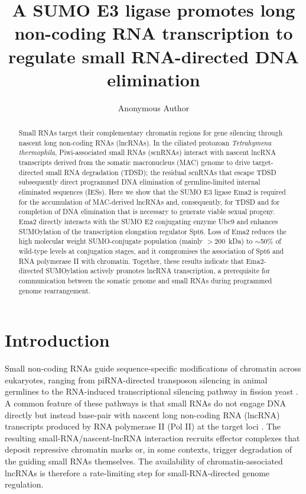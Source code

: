 \documentclass[11pt,a4paper]{article}
\title{A SUMO E3 ligase promotes long non-coding RNA transcription to regulate small RNA-directed DNA elimination}
\author[1]{Anonymous Author}
\affil[1]{Institute of Molecular Biology}
\date{}
\begin{document}
\maketitle

\begin{abstract}
Small RNAs target their complementary chromatin regions for gene silencing through nascent long non-coding RNAs (lncRNAs). In the ciliated protozoan \textit{Tetrahymena thermophila}, Piwi-associated small RNAs (scnRNAs) interact with nascent lncRNA transcripts derived from the somatic macronucleus (MAC) genome to drive target-directed small RNA degradation (TDSD); the residual scnRNAs that escape TDSD subsequently direct programmed DNA elimination of germline-limited internal eliminated sequences (IESs). Here we show that the SUMO E3 ligase Ema2 is required for the accumulation of MAC-derived lncRNAs and, consequently, for TDSD and for completion of DNA elimination that is necessary to generate viable sexual progeny. Ema2 directly interacts with the SUMO E2 conjugating enzyme Ubc9 and enhances SUMOylation of the transcription elongation regulator Spt6. Loss of Ema2 reduces the high molecular weight SUMO-conjugate population (mainly $>$200~kDa) to $\sim$50\% of wild-type levels at conjugation stages, and it compromises the association of Spt6 and RNA polymerase II with chromatin. Together, these results indicate that Ema2-directed SUMOylation actively promotes lncRNA transcription, a prerequisite for communication between the somatic genome and small RNAs during programmed genome rearrangement.
\end{abstract}

\section{Introduction}

Small non-coding RNAs guide sequence-specific modifications of chromatin across eukaryotes, ranging from piRNA-directed transposon silencing in animal germlines to the RNA-induced transcriptional silencing pathway in fission yeast \citep{Grewal2010,Czech2018}. A common feature of these pathways is that small RNAs do not engage DNA directly but instead base-pair with nascent long non-coding RNA (lncRNA) transcripts produced by RNA polymerase II (Pol II) at the target loci \citep{Moazed2009,Holoch2015}. The resulting small-RNA/nascent-lncRNA interaction recruits effector complexes that deposit repressive chromatin marks or, in some contexts, trigger degradation of the guiding small RNAs themselves. The availability of chromatin-associated lncRNAs is therefore a rate-limiting step for small-RNA-directed genome regulation.
\end{document}
